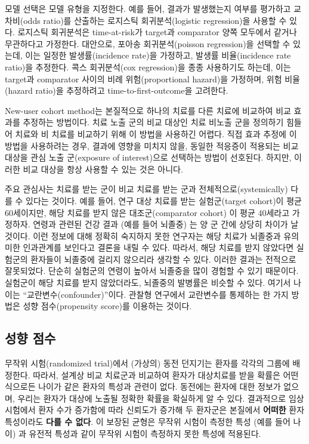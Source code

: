 \documentclass[11pt]{book}
\theoremstyle{definition}
\theoremstyle{definition}
\theoremstyle{definition}
\theoremstyle{remark}
\let\BeginKnitrBlock\begin \let\EndKnitrBlock\end
\begin{document}
모델 선택은 모델 유형을 지정한다. 예를 들어, 결과가 발생했는지 여부를
평가하고 교차비(odds ratio)를 산출하는 로지스틱 회귀분석(logistic
regression)을 사용할 수 있다. 로지스틱 회귀분석은 time-at-risk가
target과 comparator 양쪽 모두에서 같거나 무관하다고 가정한다. 대안으로,
포아송 회귀분석(poisson regression)을 선택할 수 있는데, 이는 일정한
발생률(incidence rate)을 가정하고, 발생률 비율(incidence rate ratio)을
추정한다. 콕스 회귀분석(cox regression)을 종종 사용하기도 하는데, 이는
target과 comparator 사이의 비례 위험(proportional hazard)을 가정하며,
위험 비율(hazard ratio)을 추정하려고 time-to-first-outcome을 고려한다.
 

\BeginKnitrBlock{rmdimportant}
New-user cohort method는 본질적으로 하나의 치료를 다른 치료에 비교하여
비교 효과를 추정하는 방법이다. 치료 노출 군의 비교 대상인 치료 비노출
군을 정의하기 힘들어 치료와 비 치료를 비교하기 위해 이 방법을 사용하긴
어렵다. 직접 효과 추정에 이 방법을 사용하려는 경우, 결과에 영향을 미치지
않을, 동일한 적응증이 적용되는 비교 대상을 관심 노출 군(exposure of
interest)으로 선택하는 방법이 선호된다. 하지만, 이러한 비교 대상을 항상
사용할 수 있는 것은 아니다.
\EndKnitrBlock{rmdimportant}

주요 관심사는 치료를 받는 군이 비교 치료를 받는 군과
전체적으로(systemically) 다를 수 있다는 것이다. 예를 들어, 연구 대상
치료를 받는 실험군(target cohort)이 평균 60세이지만, 해당 치료를 받지
않은 대조군(comparator cohort) 이 평균 40세라고 가정하자. 연령과 관련된
건강 결과 (예를 들어 뇌졸중) 는 양 군 간에 상당히 차이가 날 것이다. 이런
정보에 대해 정확히 숙지하지 못한 연구자는 해당 치료가 뇌졸중과 유의미한
인과관계를 보인다고 결론을 내릴 수 있다. 따라서, 해당 치료를 받지
않았다면 실험군의 환자들이 뇌졸중에 걸리지 않으리라 생각할 수 있다.
이러한 결과는 전적으로 잘못되었다. 단순히 실험군의 연령이 높아서
뇌졸중을 많이 경험할 수 있기 때문이다. 실험군이 해당 치료를 받지
않았더라도, 뇌졸중의 발병률은 비슷할 수 있다. 여기서 나이는
``교란변수(confounder)''이다. 관찰형 연구에서 교란변수를 통제하는 한
가지 방법은 성향 점수(propensity score)를 이용하는 것이다.

\subsection{성향 점수}\label{-}


무작위 시험(randomized trial)에서 (가상의) 동전 던지기는 환자를 각각의
그룹에 배정한다. 따라서, 설계상 비교 치료군과 비교하여 환자가 대상치료를
받을 확률은 어떤 식으로든 나이가 같은 환자의 특성과 관련이 없다.
동전에는 환자에 대한 정보가 없으며, 우리는 환자가 대상에 노출될 정확한
확률을 확실하게 알 수 있다. 결과적으로 임상시험에서 환자 수가 증가함에
따라 신뢰도가 증가해 두 환자군은 본질에서 \textbf{어떠한} 환자
특성이라도 \textbf{다를 수 없다}. 이 보장된 균형은 무작위 시험이 측정한
특성 (예를 들어 나이) 과 유전적 특성과 같이 무작위 시험이 측정하지 못한
특성에 적용된다. 
\end{document}
